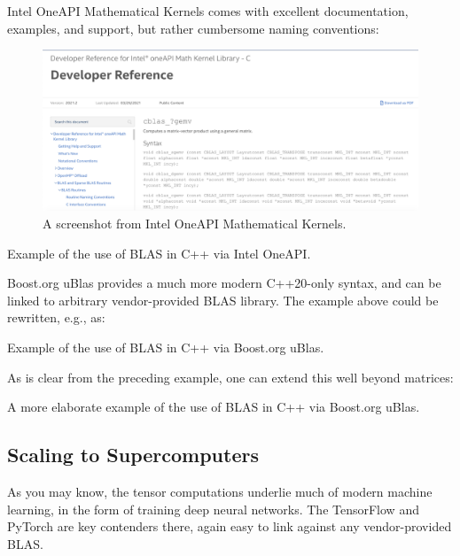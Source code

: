 Intel OneAPI Mathematical Kernels comes with excellent documentation, 
examples, and support, but rather cumbersome naming conventions:

\begin{figure}[t!]
\includegraphics[width=\textwidth]{./static/blas01.png}
\caption{A screenshot from Intel OneAPI Mathematical Kernels.}
\label{blas01png}
\end{figure}

\begin{codebox}[breakable]{}
\footnotesize Example of the use of BLAS in C++ via Intel OneAPI.
\tcblower
{}
\end{codebox}

Boost.org uBlas provides a much more modern C++20-only syntax,
and can be linked to arbitrary vendor-provided BLAS library.
The example above could be rewritten, e.g., as:

\begin{codebox}[breakable]{}
    \footnotesize Example of the use of BLAS in C++ via Boost.org uBlas.
    \tcblower
\end{codebox}

As is clear from the preceding example, one can extend this well beyond matrices:

\begin{codebox}[breakable]{}
        \footnotesize A more elaborate example of the use of BLAS in C++ via Boost.org uBlas.
        \tcblower
\end{codebox}

\subsection{Scaling to Supercomputers}

As you may know, the tensor computations underlie much of modern machine learning,
in the form of training deep neural networks. 
The TensorFlow and PyTorch are key contenders there, 
again easy to link against any vendor-provided BLAS. 


